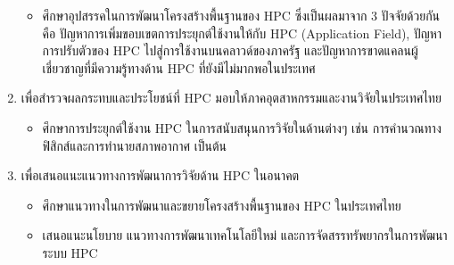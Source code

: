 \documentclass[a4paper,12pt]{extarticle}
\begin{document}
\begin{enumerate}
\begin{itemize}
		\item ศึกษาอุปสรรคในการพัฒนาโครงสร้างพื้นฐานของ HPC ซึ่งเป็นผลมาจาก 3 ปัจจัยด้วยกันคือ ปัญหาการเพิ่มขอบเขตการประยุกต์ใช้งานให้กับ HPC (Application Field), ปัญหาการปรับตัวของ HPC ไปสู่การใช้งานบนคลาวด์ของภาครัฐ และปัญหาการขาดแคลนผู้เชี่ยวชาญที่มีความรู้ทางด้าน HPC ที่ยังมีไม่มากพอในประเทศ
	\end{itemize}
    \item เพื่อสำรวจผลกระทบและประโยชน์ที่ HPC มอบให้ภาคอุตสาหกรรมและงานวิจัยในประเทศไทย
    \begin{itemize}
		\item ศึกษาการประยุกต์ใช้งาน HPC ในการสนับสนุนการวิจัยในด้านต่างๆ เช่น การคำนวณทางฟิสิกส์และการทำนายสภาพอากาศ เป็นต้น
	\end{itemize}
    \item เพื่อเสนอแนะแนวทางการพัฒนาการวิจัยด้าน HPC ในอนาคต
    \begin{itemize}
		\item ศึกษาแนวทางในการพัฒนาและขยายโครงสร้างพื้นฐานของ HPC ในประเทศไทย
		\item เสนอแนะนโยบาย แนวทางการพัฒนาเทคโนโลยีใหม่ และการจัดสรรทรัพยากรในการพัฒนาระบบ HPC
	\end{itemize}
\end{enumerate}

\newpage

\end{document}
